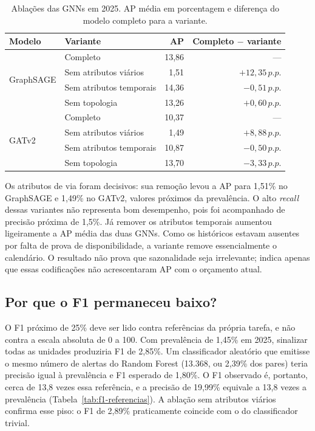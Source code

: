 \documentclass[12pt]{article}
\newcommand{\pp}{\,p.p.}
\begin{document}
\begin{table}[htbp]
\centering
\caption{Ablações das GNNs em 2025. AP média em porcentagem e diferença
do modelo completo para a variante.}
\label{tab:ablacoes}
\small
\setlength{\tabcolsep}{5pt}
\begin{tabular}{llrr}
\toprule
\textbf{Modelo} & \textbf{Variante} & \textbf{AP} &
\textbf{Completo $-$ variante} \\
\midrule
\multirow{4}{*}{GraphSAGE}
& Completo & 13,86 & --- \\
& Sem atributos viários & 1,51 & $+12,35\pp$ \\
& Sem atributos temporais & 14,36 & $-0,51\pp$ \\
& Sem topologia & 13,26 & $+0,60\pp$ \\
\midrule
\multirow{4}{*}{GATv2}
& Completo & 10,37 & --- \\
& Sem atributos viários & 1,49 & $+8,88\pp$ \\
& Sem atributos temporais & 10,87 & $-0,50\pp$ \\
& Sem topologia & 13,70 & $-3,33\pp$ \\
\bottomrule
\end{tabular}
\end{table}

Os atributos de via foram decisivos: sua remoção levou a AP para 1,51\%
no GraphSAGE e 1,49\% no GATv2, valores próximos da prevalência. O alto
\textit{recall} dessas variantes não representa bom desempenho, pois
foi acompanhado de precisão próxima de 1,5\%. Já remover os atributos
temporais aumentou ligeiramente a AP média das duas GNNs. Como os
históricos estavam ausentes por falta de prova de disponibilidade, a
variante remove essencialmente o calendário. O resultado não prova que
sazonalidade seja irrelevante; indica apenas que essas codificações não
acrescentaram AP com o orçamento atual.

\subsection{Por que o F1 permaneceu baixo?}
\label{subsec:f1}

O F1 próximo de 25\% deve ser lido contra referências da própria tarefa,
e não contra a escala absoluta de 0 a 100. Com prevalência de 1,45\% em
2025, sinalizar todas as unidades produziria F1 de 2,85\%. Um
classificador aleatório que emitisse o mesmo número de alertas do Random
Forest (13.368, ou 2,39\% dos pares) teria precisão igual à prevalência
e F1 esperado de 1,80\%. O F1 observado é, portanto, cerca de 13,8 vezes
essa referência, e a precisão de 19,99\% equivale a 13,8 vezes a
prevalência (Tabela~\ref{tab:f1-referencias}). A ablação sem atributos
viários confirma esse piso: o F1 de 2,89\% praticamente coincide com o
do classificador trivial.
\end{document}
